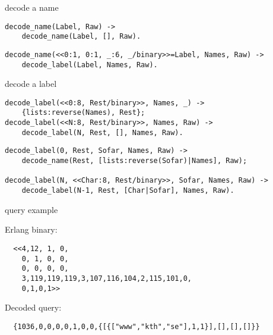 \begin{frame}[fragile]{decode a name}

\begin{verbatim}
decode_name(Label, Raw) ->
    decode_name(Label, [], Raw).
\end{verbatim}
\vspace{20pt}\pause

\begin{verbatim}
decode_name(<<0:1, 0:1, _:6, _/binary>>=Label, Names, Raw) -> 
    decode_label(Label, Names, Raw).
\end{verbatim}
\end{frame}


\begin{frame}[fragile]{decode a label}

\begin{verbatim}
decode_label(<<0:8, Rest/binary>>, Names, _) ->
    {lists:reverse(Names), Rest};
decode_label(<<N:8, Rest/binary>>, Names, Raw) ->
    decode_label(N, Rest, [], Names, Raw).
\end{verbatim}

\vspace{20pt}\pause

\begin{verbatim}
decode_label(0, Rest, Sofar, Names, Raw) ->
    decode_name(Rest, [lists:reverse(Sofar)|Names], Raw);

decode_label(N, <<Char:8, Rest/binary>>, Sofar, Names, Raw) ->
    decode_label(N-1, Rest, [Char|Sofar], Names, Raw).
\end{verbatim}

\end{frame}

\begin{frame}[fragile]{query example}

  Erlang binary:
\begin{verbatim}
  <<4,12, 1, 0,
    0, 1, 0, 0,
    0, 0, 0, 0,
    3,119,119,119,3,107,116,104,2,115,101,0,
    0,1,0,1>>
\end{verbatim}

\vspace{20pt} \pause
  Decoded query:
\begin{verbatim}
  {1036,0,0,0,0,1,0,0,{[{["www","kth","se"],1,1}],[],[],[]}}
\end{verbatim}  

\end{frame}

